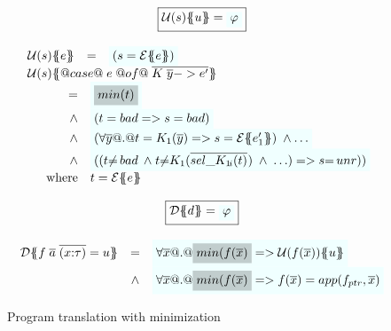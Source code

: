\begin{figure}\small
\setlength{\arraycolsep}{2pt}
\[\begin{array}{c}
\ruleform{\utrans{\Sigma}{u}{s} = \formula{\phi}} \\ \\
\begin{array}{rcl}
\utrans{\Sigma}{e}{s}
  & = & \formula{(s = \etrans{\Sigma}{\Gamma}{e})} \\
\multicolumn{3}{l}{\utrans{\Sigma}
    {@case@\;e\;@of@\;\ol{K\;\ol{y} -> e'}}{s}} \\
\multicolumn{3}{l}{
\quad
  \begin{array}[t]{rl}
    =     & \formula{\highlight{min(t)}} \\  
    \land & \formula{(t = \bad => s = bad)} \\
    \land & \formula{(\forall \ol{y} @.@ t = K_1(\ol{y}) => s = \etrans{\Sigma}{\Gamma}{e'_1})\;\land \ldots}  \\
    \land & \formula{((t{\neq}\bad\;\land\;
                 t{\neq}K_1(\oln{{\sel{K_1}{i}}(t)}{})\;\land\;\ldots) => s{=}\unr))} \\
    \mbox{where} & t  =  \etrans{\Sigma}{\Gamma}{e}
 \end{array}
}
\end{array}
\\ \\
\ruleform{\dtrans{\Sigma}{d} = \formula{\phi}} \\ \\
\begin{array}{rcl}
  \dtrans{\Sigma}{f \;\ol{a}\;\ol{(x{:}\tau)} = u}
    & =     & \formula{\forall \ol{x} @.@ \highlight{min(f(\ol{x})} => \utrans{\sigma}{u}{f(\ol{x})}} \\
    & \land & \formula{\forall \ol{x} @.@ \highlight{min(f(\ol{x})} => f(\ol{x}) = app(f_{ptr},\xs)} \\
\end{array}
\end{array}\]
\caption{Program translation with minimization}\label{fig:min-def-trans-min}
\end{figure}

